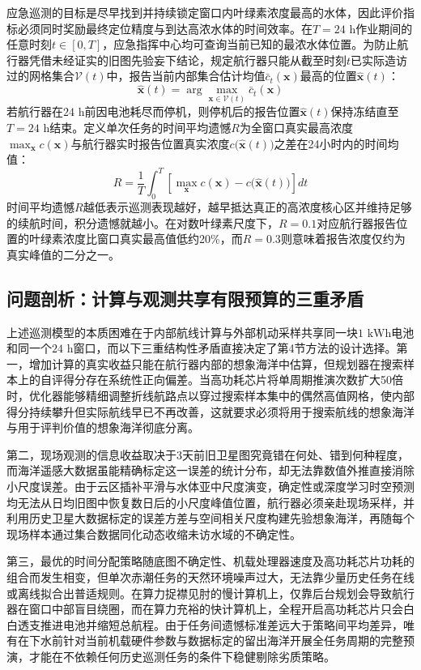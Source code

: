 应急巡测的目标是尽早找到并持续锁定窗口内叶绿素浓度最高的水体，因此评价指标必须同时奖励最终定位精度与到达高浓水体的时间效率。在$T=24\text{ h}$作业期间的任意时刻$t \in [0, T]$，应急指挥中心均可查询当前已知的最浓水体位置。为防止航行器凭借未经证实的旧图先验妄下结论，规定航行器只能从截至时刻$t$已实际造访过的网格集合$\mathcal{V}(t)$中，报告当前内部集合估计均值$\bar{c}_t(\mathbf{x})$最高的位置$\hat{\mathbf{x}}(t)$：
\begin{equation}
  \hat{\mathbf{x}}(t) = \arg\max_{\mathbf{x}\in\mathcal{V}(t)} \bar{c}_t(\mathbf{x})
  \label{eq:answer}
\end{equation}
若航行器在$24\text{ h}$前因电池耗尽而停机，则停机后的报告位置$\hat{\mathbf{x}}(t)$保持冻结直至$T=24\text{ h}$结束。定义单次任务的时间平均遗憾$R$为全窗口真实最高浓度$\max_{\mathbf{x}} c(\mathbf{x})$与航行器实时报告位置真实浓度$c\big(\hat{\mathbf{x}}(t)\big)$之差在24小时内的时间均值：
\begin{equation}
  R = \frac{1}{T}\int_0^T \left[\max_{\mathbf{x}} c(\mathbf{x}) - c\big(\hat{\mathbf{x}}(t)\big)\right] dt
  \label{eq:regret}
\end{equation}
时间平均遗憾$R$越低表示巡测表现越好，越早抵达真正的高浓度核心区并维持足够的续航时间，积分遗憾就越小。在对数叶绿素尺度下，$R=0.1$对应航行器报告位置的叶绿素浓度比窗口真实最高值低约20\%，而$R=0.3$则意味着报告浓度仅约为真实峰值的二分之一。

\subsection{问题剖析：计算与观测共享有限预算的三重矛盾}

上述巡测模型的本质困难在于内部航线计算与外部机动采样共享同一块$1\text{ kWh}$电池和同一个$24\text{ h}$窗口，而以下三重结构性矛盾直接决定了第4节方法的设计选择。第一，增加计算的真实收益只能在航行器内部的想象海洋中估算，但规划器在搜索样本上的自评得分存在系统性正向偏差。当高功耗芯片将单周期推演次数扩大50倍时，优化器能够精细调整折线航路点以穿过搜索样本集中的偶然高值网格，使内部得分持续攀升但实际航线早已不再改善\cite{smith2006curse, vanhasselt2010double}，这就要求必须将用于搜索航线的想象海洋与用于评判价值的想象海洋彻底分离。

第二，现场观测的信息收益取决于3天前旧卫星图究竟错在何处、错到何种程度，而海洋遥感大数据虽能精确标定这一误差的统计分布，却无法靠数值外推直接消除小尺度误差。由于云区插补平滑与水体亚中尺度演变，确定性或深度学习时空预测均无法从日均旧图中恢复数日后的小尺度峰值位置\cite{assran2025vjepa2}，航行器必须亲赴现场采样，并利用历史卫星大数据标定的误差方差与空间相关尺度构建先验想象海洋，再随每个现场样本通过集合数据同化动态收缩未访水域的不确定性。

第三，最优的时间分配策略随底图不确定性、机载处理器速度及高功耗芯片功耗的组合而发生相变，但单次赤潮任务的天然环境噪声过大，无法靠少量历史任务在线或离线拟合出普适规则。在算力捉襟见肘的慢计算机上，仅靠后台规划会导致航行器在窗口中部盲目绕圈，而在算力充裕的快计算机上，全程开启高功耗芯片只会白白透支推进电池并缩短总航程。由于任务间遗憾标准差远大于策略间平均差异，唯有在下水前针对当前机载硬件参数与数据标定的留出海洋开展全任务周期的完整预演，才能在不依赖任何历史巡测任务的条件下稳健剔除劣质策略。
